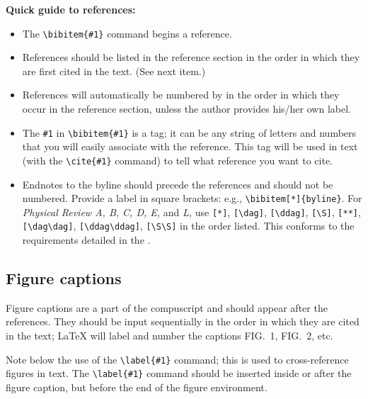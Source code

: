 \bigskip

{\bf Quick guide to references:}

\begin{itemize}
\item The \verb+\bibitem{#1}+ command begins a reference.

\item  References should be listed in the reference section in the order in
which they are first cited in the text. (See next item.)

\item  References will automatically be numbered by \REVTeX{} in the order
in which they occur in the reference section, unless the author provides
his/her own label.

\item  The \verb+#1+ in \verb+\bibitem{#1}+ is a tag; it can be any string
of letters and numbers that you will easily associate with the reference.
This tag will be used in text (with the \verb+\cite{#1}+ command) to tell
\REVTeX{} what reference you want to cite.

\item  Endnotes to the byline should precede the references and should not
be numbered.  Provide a label in square brackets: e.g.,
\verb+\bibitem[*]{byline}+. For {\em Physical Review A, B, C, D, E,} and
{\em L,} use \verb+[*]+, \verb+[\dag]+,  \verb+[\ddag]+, \verb+[\S]+,
\verb+[**]+, \verb+[\dag\dag]+,  \verb+[\ddag\ddag]+, \verb+[\S\S]+ in the
order listed. This conforms to the requirements detailed in the \SNG{}.

\end{itemize}



\subsection{Figure captions}

Figure captions are a part of the compuscript and should appear after the
references. They should be input sequentially in the order in which they
are cited in the text; \LaTeX{}  will label and number the captions FIG.~1,
FIG.~2, etc.

Note below the use of the \verb+\label{#1}+ command; this is used to
cross-reference figures in text. The \verb+\label{#1}+ command should be
inserted inside or after the figure caption, but before the end of the
figure environment.

\smallskip

